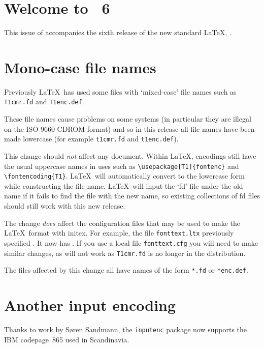 \documentclass{ltnews}
\providecommand\pkg[1]{\texttt{#1}}
\providecommand\file[1]{\texttt{#1}}
\begin{document}
\maketitle

\section{Welcome to \LaTeXNews~6}
This issue of \emph{\LaTeXNews} accompanies the sixth release of the
new standard \LaTeX{}, \LaTeXe.

\section{Mono-case file names}
Previously \LaTeX\ has used some files with `mixed-case' file names
such as \file{T1cmr.fd} and \file{T1enc.def}.

These file names cause problems on some systems (in particular they
are illegal on the ISO 9660 CDROM format) and so in this release
all file names have been made lowercase (for example
\file{t1cmr.fd} and \file{t1enc.def}).

This change should \emph{not} affect any document. Within \LaTeX,
encodings still have the usual uppercase names in uses such as
\verb|\usepackage[T1]{fontenc}| and \verb|\fontencoding{T1}|.
\LaTeX\ will automatically convert to the lowercase form while
constructing the file name.
\LaTeX\ will input the `fd' file under the old name if it fails to
find the file with the new name, so existing collections of fd files
should still work with this new release.

The change \emph{does} affect the configuration files that may be used
to make the \LaTeX\ format with initex. For example, the file
\file{fonttext.ltx} previously specified \verb||.
It now has \verb||.
If you use a local file \file{fonttext.cfg}
you will need to make similar changes, as \verb||
will not work as \file{T1cmr.fd} is no longer in the distribution.

The files affected by this change all have names of the form
\verb|*.fd| or \verb|*enc.def|.

\section{Another input encoding}
Thanks to work by S\o ren Sandmann, the \pkg{inputenc} package now
supports the IBM codepage~865 used in Scandinavia.
\end{document}
